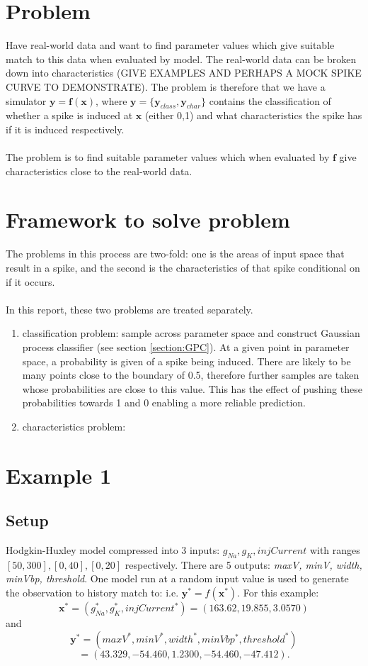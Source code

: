 \documentclass{article}
\newcommand{\simulator}{f}
\newcommand{\inputVec}{\mathbf{x}}
\newcommand{\outputVec}{\mathbf{y}}
\begin{document}
\section{Problem}
Have real-world data and want to find parameter values which give suitable match to this data when evaluated by model. The real-world data can be broken down into characteristics (GIVE EXAMPLES AND PERHAPS A MOCK SPIKE CURVE TO DEMONSTRATE). The problem is therefore that we have a simulator $\outputVec = \mathbf{\simulator}(\inputVec)$, where $\outputVec = \{\outputVec_{class}, \outputVec_{char}\}$ contains the classification of whether a spike is induced at $\inputVec$ (either 0,1) and what characteristics the spike has if it is induced respectively.\\\\
The problem is to find suitable parameter values which when evaluated by $\mathbf{\simulator}$ give characteristics close to the real-world data.
\section{Framework to solve problem}
The problems in this process are two-fold: one is the areas of input space that result in a spike, and the second is the characteristics of that spike conditional on if it occurs.\\\\
In this report, these two problems are treated separately.
\begin{enumerate}
    \item classification problem: sample across parameter space and construct Gaussian process classifier (see section \ref{section:GPC}). At a given point in parameter space, a probability is given of a spike being induced. There are likely to be many points close to the boundary of 0.5, therefore further samples are taken whose probabilities are close to this value. This has the effect of pushing these probabilities towards 1 and 0 enabling a more reliable prediction.

    \item characteristics problem: 
\end{enumerate}
\section{Example 1}
\subsection{Setup}
Hodgkin-Huxley model compressed into 3 inputs: $g_{Na}, g_K, injCurrent$ with ranges $[50,300], [0,40], [0,20]$ respectively. There are 5 outputs: {\it maxV, minV, width, minVbp, threshold}. One model run at a random input value is used to generate the observation to history match to: i.e. $\outputVec^* = \simulator(\inputVec^*)$. For this example:\[\inputVec^* = (g_{Na}^*,g_K^*,injCurrent^*) = (163.62, 19.855, 3.0570)\] and \[\outputVec^* = (maxV^*, minV^*, width^*, minVbp^*, threshold^*)\]\[ = (43.329, -54.460, 1.2300, -54.460, -47.412).\]
\end{document}
